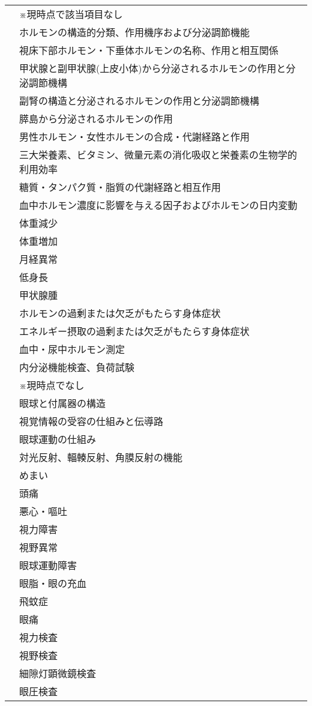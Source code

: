 \begin{xltabular}{\linewidth}{XX}
 & ※現時点で該当項目なし \\
 & ホルモンの構造的分類、作用機序および分泌調節機能 \\
 & 視床下部ホルモン・下垂体ホルモンの名称、作用と相互関係 \\
 & 甲状腺と副甲状腺(上皮小体)から分泌されるホルモンの作用と分泌調節機構 \\
 & 副腎の構造と分泌されるホルモンの作用と分泌調節機構 \\
 & 膵島から分泌されるホルモンの作用 \\
 & 男性ホルモン・女性ホルモンの合成・代謝経路と作用 \\
 & 三大栄養素、ビタミン、微量元素の消化吸収と栄養素の生物学的利用効率 \\
 & 糖質・タンパク質・脂質の代謝経路と相互作用 \\
 & 血中ホルモン濃度に影響を与える因子およびホルモンの日内変動 \\
 & 体重減少 \\
 & 体重増加 \\
 & 月経異常 \\
 & 低身長 \\
 & 甲状腺腫 \\
 & ホルモンの過剰または欠乏がもたらす身体症状 \\
 & エネルギー摂取の過剰または欠乏がもたらす身体症状 \\
 & 血中・尿中ホルモン測定 \\
 & 内分泌機能検査、負荷試験 \\
 & ※現時点でなし \\
 & 眼球と付属器の構造 \\
 & 視覚情報の受容の仕組みと伝導路 \\
 & 眼球運動の仕組み \\
 & 対光反射、輻輳反射、角膜反射の機能 \\
 & めまい \\
 & 頭痛 \\
 & 悪心・嘔吐 \\
 & 視力障害 \\
 & 視野異常 \\
 & 眼球運動障害 \\
 & 眼脂・眼の充血 \\
 & 飛蚊症 \\
 & 眼痛 \\
 & 視力検査 \\
 & 視野検査 \\
 & 細隙灯顕微鏡検査 \\
 & 眼圧検査 \\

\end{xltabular}
